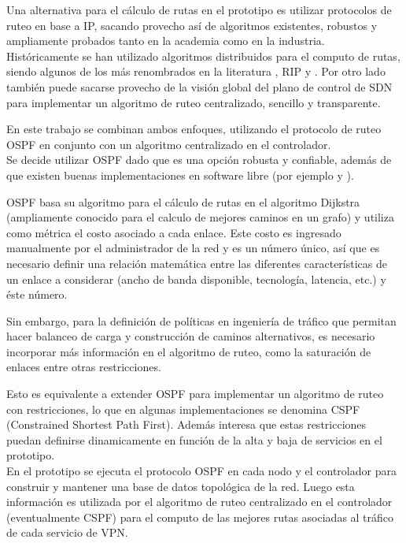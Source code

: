 Una alternativa para el c\'alculo de rutas en el prototipo es utilizar protocolos de ruteo en base a IP, sacando provecho as\'i de algoritmos existentes, robustos y ampliamente probados tanto en la academia como en la industria.\\

Hist\'oricamente se han utilizado algoritmos distribuidos para el computo de rutas, siendo algunos de los m\'as renombrados en la literatura \cite{moy1998rfc}, RIP\cite{malkin1994rip} y \cite{routingprotocol}. Por otro lado también puede sacarse provecho de la visi\'on global del plano de control de SDN para implementar un algoritmo de ruteo centralizado, sencillo y transparente.

En este trabajo se combinan ambos enfoques, utilizando el protocolo de ruteo OSPF en conjunto con un algoritmo centralizado en el controlador.\\

Se decide utilizar OSPF dado que es una opción robusta y confiable, adem\'as de que existen buenas implementaciones en software libre (por ejemplo \cite{Quagga} y \cite{BIRD}).

OSPF basa su algoritmo para el c\'alculo de rutas en el algoritmo Dijkstra (ampliamente conocido para el calculo de mejores caminos en un grafo) y utiliza como m\'etrica el costo asociado a cada enlace. Este costo es ingresado manualmente por el administrador de la red y es un n\'umero \'unico, as\'i que es necesario definir una relaci\'on matem\'atica entre las diferentes caracter\'isticas de un enlace a considerar (ancho de banda disponible, tecnolog\'ia, latencia, etc.) y \'este n\'umero.

Sin embargo, para la definición de políticas en ingeniería de tr\'afico que permitan hacer balanceo de carga y construcción de caminos alternativos, es necesario incorporar m\'as informaci\'on en el algoritmo de ruteo, como la saturaci\'on de enlaces entre otras restricciones.

Esto es equivalente a extender OSPF para implementar un algoritmo de ruteo con restricciones, lo que en algunas implementaciones se denomina CSPF (Constrained Shortest Path First). Adem\'as interesa que estas restricciones puedan definirse dinamicamente en función de la alta y baja de servicios en el prototipo.\\

En el prototipo se ejecuta el protocolo OSPF en cada nodo y el controlador para construir y mantener una base de datos topol\'ogica de la red. Luego esta información es utilizada por el algoritmo de ruteo centralizado en el controlador (eventualmente CSPF) para el computo de las mejores rutas asociadas al tr\'afico de cada servicio de VPN.\\

